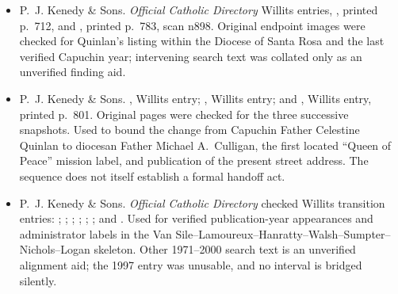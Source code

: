 \begin{itemize}[leftmargin=1.35em,itemsep=0.2em,topsep=0.2em]
\item P.~J. Kenedy \& Sons. \emph{Official Catholic Directory} Willits entries, , printed p.~712, and , printed p.~783, scan n898. Original endpoint images were checked for Quinlan's listing within the Diocese of Santa Rosa and the last verified Capuchin year; intervening search text was collated only as an unverified finding aid.
\item P.~J. Kenedy \& Sons. , Willits entry; , Willits entry; and , Willits entry, printed p.~801. Original pages were checked for the three successive snapshots. Used to bound the change from Capuchin Father Celestine Quinlan to diocesan Father Michael A.~Culligan, the first located ``Queen of Peace'' mission label, and publication of the present street address. The sequence does not itself establish a formal handoff act.
\item P.~J. Kenedy \& Sons. \emph{Official Catholic Directory} checked Willits transition entries: ; ; ; ; ; ; and . Used for verified publication-year appearances and administrator labels in the Van Sile--Lamoureux--Hanratty--Walsh--Sumpter--Nichols--Logan skeleton. Other 1971--2000 search text is an unverified alignment aid; the 1997 entry was unusable, and no interval is bridged silently.
\end{itemize}

